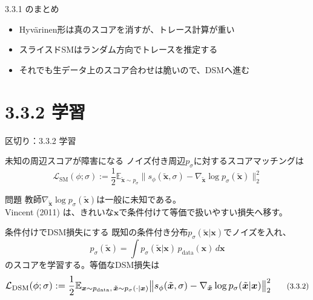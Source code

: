 \asmain
\begin{frame}{3.3.1 のまとめ}
    \begin{itemize}
        \item Hyv\"arinen形は真のスコアを消すが、トレース計算が重い
        \item スライスドSMはランダム方向でトレースを推定する
        \item それでも生データ上のスコア合わせは脆いので、DSMへ進む
    \end{itemize}
\end{frame}
\section{3.3.2 学習}
\asmain
\begin{frame}{区切り：3.3.2 学習}
    \tableofcontents[currentsection]
\end{frame}
\asmain
\begin{frame}{未知の周辺スコアが障害になる}
    ノイズ付き周辺$p_{\sigma}$に対するスコアマッチングは
    \[
        \mathcal{L}_{\mathrm{SM}}(\phi;\sigma)
        :=
        \frac12
        \mathbb{E}_{\tilde{\bm{x}}\sim p_{\sigma}}
        \bigl\|
        s_\phi(\tilde{\bm{x}},\sigma)
        -
        \nabla_{\tilde{\bm{x}}}\log p_{\sigma}(\tilde{\bm{x}})
        \bigr\|_{2}^{2}
        \tag{3.3.1}
    \]
    \begin{block}{問題}
        教師$\nabla_{\tilde{\bm{x}}}\log p_{\sigma}(\tilde{\bm{x}})$は一般に未知である。\\
        Vincent (2011) は、きれいな$\bm{x}$で条件付けて等価で扱いやすい損失へ移す。
    \end{block}
\end{frame}
\asmain
\begin{frame}{条件付けでDSM損失にする}
    既知の条件付き分布$p_{\sigma}(\tilde{\bm{x}}|\bm{x})$でノイズを入れ、
    \[
        p_{\sigma}(\tilde{\bm{x}})
        =
        \int
        p_{\sigma}(\tilde{\bm{x}}|\bm{x})\,
        p_{\mathrm{data}}(\bm{x})\,
        d\bm{x}
    \]
    のスコアを学習する。等価なDSM損失は
    \[
        \resizebox{0.98\textwidth}{!}{$
        \mathcal{L}_{\mathrm{DSM}}(\phi;\sigma)
        :=
        \dfrac12
        \mathbb{E}_{\bm{x}\sim p_{\mathrm{data}},\,
        \tilde{\bm{x}}\sim p_{\sigma}(\cdot|\bm{x})}
        \bigl\|
        s_\phi(\tilde{\bm{x}},\sigma)
        -
        \nabla_{\tilde{\bm{x}}}\log p_{\sigma}(\tilde{\bm{x}}|\bm{x})
        \bigr\|_{2}^{2}
        $}
        \tag{3.3.2}
    \]
\end{frame}
